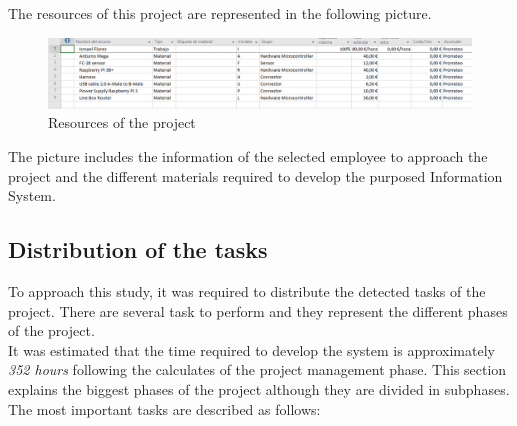 The resources of this project are represented in the following picture.

\begin{figure}[H]
\begin{centering}
\includegraphics[scale=0.5]{IMGS/resources_project.PNG}
\caption{Resources of the project \label{Resources of the project}}
\end{centering}
\end{figure}

The picture includes the information of the selected employee to approach the project and the different materials required to develop the purposed Information System.

\subsection{Distribution of the tasks}

To approach this study, it was required to distribute the detected tasks of the project. There are several task to perform and they represent the different phases of the project.\\

It was estimated that the time required to develop the system is approximately \textit{352 hours} following the calculates of the project management phase. This section explains the biggest phases of the project although they are divided in subphases. The most important tasks are described as follows:

